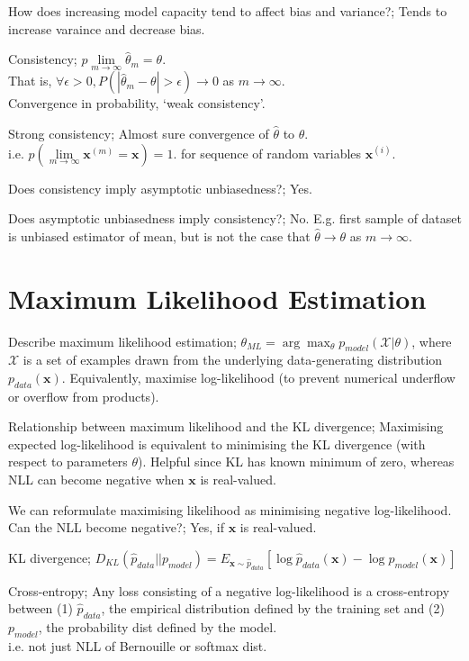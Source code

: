 \documentclass{article}
\begin{document}
How does increasing model capacity tend to affect bias and variance?; Tends to increase varaince and decrease bias.

Consistency; $p\lim\limits_{m\rightarrow\infty}\hat{\theta}_m = \theta$. \\ That is, $\forall \epsilon > 0, P(|\hat{\theta}_m-\theta|>\epsilon)\rightarrow 0$ as $m\rightarrow\infty$. \\ Convergence in probability, `weak consistency'.

Strong consistency; Almost sure convergence of $\hat{\theta}$ to $\theta$. \\ i.e. $p(\lim\limits_{m\rightarrow\infty}\mathbf{x}^{(m)}=\mathbf{x})=1$. for sequence of random variables $\mathbf{x}^{(i)}$.

Does consistency imply asymptotic unbiasedness?; Yes.

Does asymptotic unbiasedness imply consistency?; No. E.g. first sample of dataset is unbiased estimator of mean, but is not the case that $\hat{\theta}\rightarrow\theta$ as $m\rightarrow\infty$.

\section{Maximum Likelihood Estimation}

Describe maximum likelihood estimation; $\theta_{ML} = \arg\max_{\theta} p_{model}(\mathcal{X} | \theta)$, where $\mathcal{X}$ is a set of examples drawn from the underlying data-generating distribution $p_{data}(\mathbf{x})$. Equivalently, maximise log-likelihood (to prevent numerical underflow or overflow from products).

Relationship between maximum likelihood and the KL divergence; Maximising expected log-likelihood is equivalent to minimising the KL divergence (with respect to parameters $\theta$). Helpful since KL has known minimum of zero, whereas NLL can become negative when $\mathbf{x}$ is real-valued.

We can reformulate maximising likelihood as minimising negative log-likelihood. Can the NLL become negative?; Yes, if $\mathbf{x}$ is real-valued.

KL divergence; $D_{KL}(\hat{p}_{data}||p_{model}) = E_{\mathbf{x}\sim \hat{p}_{data}}[\log\hat{p}_{data}(\mathbf{x})-\log p_{model}(\mathbf{x})]$

Cross-entropy; Any loss consisting of a negative log-likelihood is a cross-entropy between (1) $\hat{p}_{data}$, the empirical distribution defined by the training set and (2) $p_{model}$, the probability dist defined by the model. \\ i.e. not just NLL of Bernouille or softmax dist.
\end{document}
